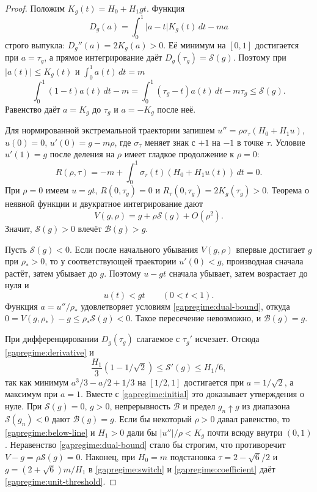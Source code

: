 \begin{proof}\label{gapregime:proof}
Положим $K_g(t)=H_0+H_1gt$. Функция
\[
 D_g(a)=\int_0^1|a-t|K_g(t)\,dt-ma
\]
строго выпукла: $D_g''(a)=2K_g(a)>0$.
Её минимум на $[0,1]$ достигается при $a=\tau_g$,
а прямое интегрирование даёт $D_g(\tau_g)=\mathcal S(g)$.
Поэтому при $|a(t)|\le K_g(t)$ и $\int_0^1a(t)\,dt=m$
\begin{equation}\label{gapregime:dual-bound}
 \int_0^1(1-t)a(t)\,dt-m
 =\int_0^1(\tau_g-t)a(t)\,dt-m\tau_g\le\mathcal S(g).
\end{equation}
Равенство даёт $a=K_g$ до $\tau_g$ и $a=-K_g$ после неё.

Для нормированной экстремальной траектории запишем
$u''=\rho\sigma_\tau(H_0+H_1u)$,
$u(0)=0$, $u'(0)=g-m\rho$, где $\sigma_\tau$ меняет знак
с $+1$ на $-1$ в точке $\tau$.
Условие $u'(1)=g$ после деления на $\rho$ имеет гладкое
продолжение к $\rho=0$:
\[
 R(\rho,\tau)=-m+\int_0^1\sigma_\tau(t)(H_0+H_1u(t))\,dt=0.
\]
При $\rho=0$ имеем $u=gt$, $R(0,\tau_g)=0$ и
$R_\tau(0,\tau_g)=2K_g(\tau_g)>0$.
Теорема о неявной функции и двукратное интегрирование дают
\begin{equation}\label{gapregime:variation}
 V(g,\rho)=g+\rho\mathcal S(g)+O(\rho^2).
\end{equation}
Значит, $\mathcal S(g)>0$ влечёт $\mathcal B(g)>g$.

Пусть $\mathcal S(g)<0$. Если после начального убывания
$V(g,\rho)$ впервые достигает $g$ при $\rho_*>0$, то у
соответствующей траектории $u'(0)<g$, производная сначала растёт,
затем убывает до $g$. Поэтому $u-gt$ сначала убывает, затем
возрастает до нуля и
\begin{equation}\label{gapregime:below-line}
 u(t)<gt\qquad(0<t<1).
\end{equation}
Функция $a=u''/\rho_*$ удовлетворяет условиям
\eqref{gapregime:dual-bound}, откуда
$0=V(g,\rho_*)-g\le\rho_*\mathcal S(g)<0$.
Такое пересечение невозможно, и $\mathcal B(g)=g$.

При дифференцировании $D_g(\tau_g)$ слагаемое с $\tau_g'$
исчезает. Отсюда \eqref{gapregime:derivative} и
\begin{equation}\label{gapregime:derivative-bounds}
 \frac{H_1}{3}(1-1/\sqrt2)\le\mathcal S'(g)\le H_1/6,
\end{equation}
так как минимум $a^3/3-a/2+1/3$ на $[1/2,1]$ достигается
при $a=1/\sqrt2$, а максимум при $a=1$.
Вместе с \eqref{gapregime:initial} это доказывает утверждения о нуле.
При $\mathcal S(g)=0$, $g>0$, непрерывность $\mathcal B$ и
предел $g_n\uparrow g$ из диапазона $\mathcal S(g_n)<0$
дают $\mathcal B(g)=g$.
Если бы некоторый $\rho>0$ давал равенство, то
\eqref{gapregime:below-line} и $H_1>0$ дали бы
$|u''|/\rho<K_g$ почти всюду внутри $(0,1)$.
Неравенство \eqref{gapregime:dual-bound} стало бы строгим,
что противоречит $V-g=\rho\mathcal S(g)=0$.
Наконец, при $H_0=m$ подстановка
$\tau=2-\sqrt6/2$ и $g=(2+\sqrt6)m/H_1$ в
\eqref{gapregime:switch} и \eqref{gapregime:coefficient}
даёт \eqref{gapregime:unit-threshold}.
\end{proof}

